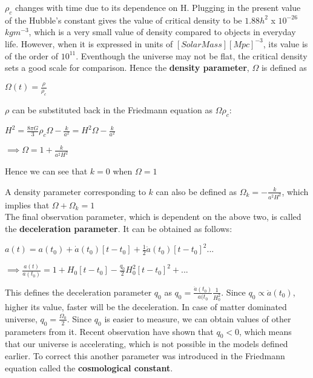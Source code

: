 $\rho_{c}$ changes with time due to its dependence on H. Plugging in the present value of the Hubble's constant gives the value of critical density to be $1.88h^2$ x $10^{-26}$ $kgm^{-3}$, which is a very small value of density compared to objects in everyday life. However, when it is expressed in units of $[Solar Mass][Mpc]^{-3}$, its value is of the order of $10^11$. Eventhough the universe may not be flat, the critical density sets a good scale for comparison. Hence the \textbf{density parameter}, $\Omega$ is defined as 

\begin{center}
    $\Omega(t) = \frac{\rho}{\rho_c}$
\end{center}

$\rho$ can be substituted back in the Friedmann equation as $\Omega\rho_c$:

\begin{center}
\begin{math}
  H^2 = \frac{8{\pi}G}{3}{\rho_c}\Omega - \frac{k}{a^2} = H^2\Omega - \frac{k}{a^2}
\end{math}
\end{center} 

\begin{center}
    $\implies \Omega = 1 + \frac{k}{a^2H^2}$
\end{center}

Hence we can see that $k=0$ when $\Omega = 1$

A density parameter corresponding to $k$ can also be defined as $\Omega_k = -\frac{k}{a^2H^2}$, which implies that $\Omega+\Omega_k=1$ \\

The final observation parameter, which is dependent on the above two, is called the \textbf{deceleration parameter}. It can be obtained as follows: 

\begin{center}
\begin{math}
    a(t) = a(t_0) + \dot{a}(t_0)[t-t_0] + \frac{1}{2}\ddot{a}(t_0)[t-t_0]^{2}...
\end{math}
\end{center}

\begin{center}
\begin{math}
   \implies \frac{a(t)}{a(t_0)} = 1+ H_0[t-t_0] - \frac{q_0}{2}H_0^2[t-t_0]^2 + ...
\end{math}
\end{center}

This defines the deceleration parameter $q_0$ as $q_0 = \frac{\ddot{a}(t_0)}{a(t_0}\frac{1}{H_0^2}$. Since $q_0 \propto \ddot{a}(t_0)$, higher its value, faster will be the deceleration. In case of matter dominated universe, $q_0 = \frac{\Omega_0}{2}$. Since $q_0$ is easier to measure, we can obtain values of other parameters from it. Recent observation have shown that $q_0<0$, which means that our universe is accelerating, which is not possible in the models defined earlier. To correct this another parameter was introduced in the Friedmann equation called the \textbf{cosmological constant}.